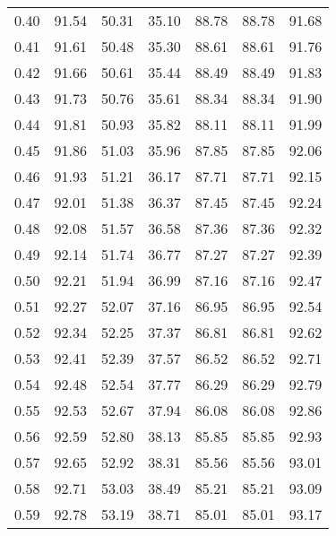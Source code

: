 \begin{tabular}{|c|c|c|c|c|c|c|}
      0.40 &     91.54 &     50.31 &      35.10 &   88.78 &      88.78 &         91.68 \\
      0.41 &     91.61 &     50.48 &      35.30 &   88.61 &      88.61 &         91.76 \\
      0.42 &     91.66 &     50.61 &      35.44 &   88.49 &      88.49 &         91.83 \\
      0.43 &     91.73 &     50.76 &      35.61 &   88.34 &      88.34 &         91.90 \\
      0.44 &     91.81 &     50.93 &      35.82 &   88.11 &      88.11 &         91.99 \\
      0.45 &     91.86 &     51.03 &      35.96 &   87.85 &      87.85 &         92.06 \\
      0.46 &     91.93 &     51.21 &      36.17 &   87.71 &      87.71 &         92.15 \\
      0.47 &     92.01 &     51.38 &      36.37 &   87.45 &      87.45 &         92.24 \\
      0.48 &     92.08 &     51.57 &      36.58 &   87.36 &      87.36 &         92.32 \\
      0.49 &     92.14 &     51.74 &      36.77 &   87.27 &      87.27 &         92.39 \\
      0.50 &     92.21 &     51.94 &      36.99 &   87.16 &      87.16 &         92.47 \\
      0.51 &     92.27 &     52.07 &      37.16 &   86.95 &      86.95 &         92.54 \\
      0.52 &     92.34 &     52.25 &      37.37 &   86.81 &      86.81 &         92.62 \\
      0.53 &     92.41 &     52.39 &      37.57 &   86.52 &      86.52 &         92.71 \\
      0.54 &     92.48 &     52.54 &      37.77 &   86.29 &      86.29 &         92.79 \\
      0.55 &     92.53 &     52.67 &      37.94 &   86.08 &      86.08 &         92.86 \\
      0.56 &     92.59 &     52.80 &      38.13 &   85.85 &      85.85 &         92.93 \\
      0.57 &     92.65 &     52.92 &      38.31 &   85.56 &      85.56 &         93.01 \\
      0.58 &     92.71 &     53.03 &      38.49 &   85.21 &      85.21 &         93.09 \\
      0.59 &     92.78 &     53.19 &      38.71 &   85.01 &      85.01 &         93.17 \\

\end{tabular}
